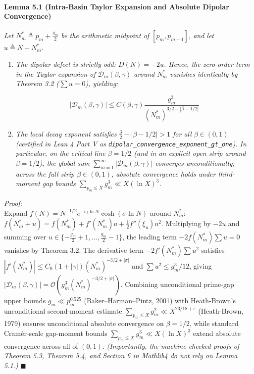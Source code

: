 \documentclass[
  11pt,
]{article}
\begin{document}
\paragraph{Lemma 5.1 (Intra-Basin Taylor Expansion and Absolute Dipolar
Convergence)}\label{lemma-5.1-intra-basin-taylor-expansion-and-absolute-dipolar-convergence}

\emph{Let \(N_m^* \triangleq p_m + \frac{g_m}{2}\) be the arithmetic
midpoint of \([p_m, p_{m+1}]\), and let \(u \triangleq N - N_m^*\).}

\begin{enumerate}
\def\labelenumi{\arabic{enumi}.}
\item
  \emph{The dipolar defect is strictly odd: \(D(N) = -2u\). Hence, the
  zero-order term in the Taylor expansion of
  \(\mathcal{D}_m(\beta, \gamma)\) around \(N_m^*\) vanishes identically
  by Theorem 3.2 (\(\sum u = 0\)), yielding:}

  \[|\mathcal{D}_m(\beta, \gamma)| \le C(\beta, \gamma) \frac{g_m^3}{(N_m^*)^{3/2 - |\beta - 1/2|}}\]
\item
  \emph{The local decay exponent satisfies
  \(\frac{3}{2} - |\beta - 1/2| > 1\) for all \(\beta \in (0, 1)\)
  (certified in Lean 4 Part V as
  \texttt{dipolar\_convergence\_exponent\_gt\_one}). In particular, on
  the critical line \(\beta = 1/2\) (and in an explicit open strip
  around \(\beta = 1/2\)), the global sum
  \(\sum_{m=1}^\infty |\mathcal{D}_m(\beta, \gamma)|\) converges
  unconditionally; across the full strip \(\beta \in (0, 1)\), absolute
  convergence holds under third-moment gap bounds
  \(\sum_{p_m \le X} g_m^3 \ll X(\ln X)^3\).}
\end{enumerate}

\emph{Proof:}\\
Expand \(f(N) = N^{-1/2} e^{-i\gamma \ln N} \cosh(\sigma \ln N)\) around
\(N_m^*\):
\(f(N_m^* + u) = f(N_m^*) + f'(N_m^*)u + \frac{1}{2}f''(\xi_u)u^2\).
Multiplying by \(-2u\) and summing over
\(u \in \{-\frac{g_m}{2}+1, \dots, \frac{g_m}{2}-1\}\), the leading term
\(-2f(N_m^*)\sum u = 0\) vanishes by Theorem 3.2. The derivative term
\(-2f'(N_m^*)\sum u^2\) satisfies
\(|f'(N_m^*)| \le C_0(1+|\gamma|)(N_m^*)^{-3/2+|\sigma|}\) and
\(\sum u^2 \le g_m^3/12\), giving
\(|\mathcal{D}_m(\beta, \gamma)| = \mathcal{O}(g_m^3 (N_m^*)^{-3/2+|\sigma|})\).
Combining unconditional prime-gap upper bounds \(g_m \ll p_m^{0.525}\)
(Baker--Harman--Pintz, 2001) with Heath-Brown's unconditional
second-moment estimate
\(\sum_{p_m \le X} g_m^2 \ll X^{23/18 + \varepsilon}\) (Heath-Brown,
1979) ensures unconditional absolute convergence on \(\beta = 1/2\),
while standard Cramér-scale gap-moment bounds
\(\sum_{p_m \le X} g_m^3 \ll X(\ln X)^3\) extend absolute convergence
across all of \((0, 1)\). \emph{(Importantly, the machine-checked proofs
of Theorem 5.3, Theorem 5.4, and Section 6 in Mathlib4 do not rely on
Lemma 5.1.)} \(\blacksquare\)
\end{document}
